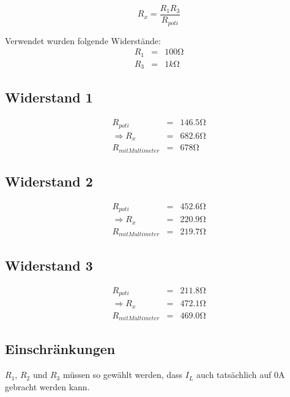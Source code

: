 \documentclass[10pt]{report}
\begin{document}
        \begin{equation*}
            R_x = \frac{R_1 R_3}{R_{poti}}
        \end{equation*}

        \vspace{0.5cm}

        Verwendet wurden folgende Widerstände:
        \begin{eqnarray*}
            R_1 &=& 100\si{\ohm}\\
            R_3 &=& 1\si{k\ohm}
        \end{eqnarray*}

        \subsection{Widerstand 1}
        \begin{eqnarray*}
            R_{poti} &=& 146.5 \si{\ohm} \\
            \Rightarrow R_{x} &=& 682.6 \si{\ohm}\\
            R_{mitMultimeter} &=& 678\si{\ohm}
        \end{eqnarray*}

        \subsection{Widerstand 2}
        \begin{eqnarray*}
            R_{poti} &=& 452.6 \si{\ohm} \\
            \Rightarrow R_{x} &=& 220.9\si{\ohm}\\
            R_{mitMultimeter} &=& 219.7\si{\ohm}
        \end{eqnarray*}

        \subsection{Widerstand 3}
        \begin{eqnarray*}
            R_{poti} &=& 211.8 \si{\ohm} \\
            \Rightarrow R_{x} &=& 472.1\si{\ohm}\\
            R_{mitMultimeter} &=& 469.0\si{\ohm}
        \end{eqnarray*}

        \subsection{Einschränkungen}
        $R_1$, $R_2$ und $R_3$ müssen so gewählt werden, dass $I_L$ auch tatsächlich
        auf $0$A gebracht werden kann.
\end{document}
